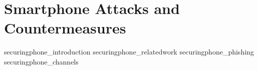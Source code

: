 \part[Smartphone Attacks and Countermeasures]{Smartphone Attacks and Countermeasures}\label{part:securingphone}

{securingphone_introduction}
{securingphone_relatedwork}
{securingphone_phishing}
{securingphone_channels}
